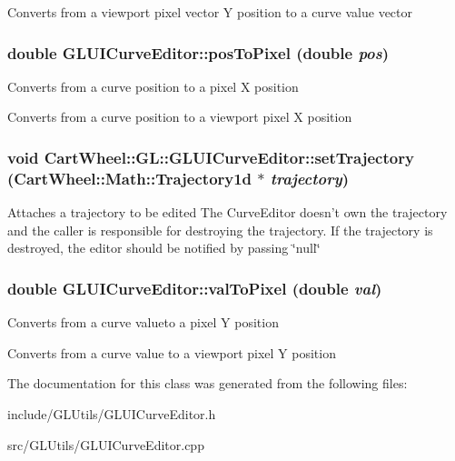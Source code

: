 Converts from a viewport pixel vector Y position to a curve value vector \hypertarget{classCartWheel_1_1GL_1_1GLUICurveEditor_a2fabff94d008f4d4575c487c43827526}{
\subsubsection[{posToPixel}]{\setlength{\rightskip}{0pt plus 5cm}double GLUICurveEditor::posToPixel (double {\em pos})}}
\label{classCartWheel_1_1GL_1_1GLUICurveEditor_a2fabff94d008f4d4575c487c43827526}
Converts from a curve position to a pixel X position

Converts from a curve position to a viewport pixel X position \hypertarget{classCartWheel_1_1GL_1_1GLUICurveEditor_a6787e7d93f5e6ab2da85f5d8b675506e}{
\subsubsection[{setTrajectory}]{\setlength{\rightskip}{0pt plus 5cm}void CartWheel::GL::GLUICurveEditor::setTrajectory ({\bf CartWheel::Math::Trajectory1d} $\ast$ {\em trajectory})}}
\label{classCartWheel_1_1GL_1_1GLUICurveEditor_a6787e7d93f5e6ab2da85f5d8b675506e}
Attaches a trajectory to be edited The CurveEditor doesn't own the trajectory and the caller is responsible for destroying the trajectory. If the trajectory is destroyed, the editor should be notified by passing \char`\"{}null\char`\"{} \hypertarget{classCartWheel_1_1GL_1_1GLUICurveEditor_a82491a5d07af8e75298bd6118739b1d8}{
\subsubsection[{valToPixel}]{\setlength{\rightskip}{0pt plus 5cm}double GLUICurveEditor::valToPixel (double {\em val})}}
\label{classCartWheel_1_1GL_1_1GLUICurveEditor_a82491a5d07af8e75298bd6118739b1d8}
Converts from a curve valueto a pixel Y position

Converts from a curve value to a viewport pixel Y position 

The documentation for this class was generated from the following files:\begin{DoxyCompactItemize}
\item 
include/GLUtils/GLUICurveEditor.h\item 
src/GLUtils/GLUICurveEditor.cpp\end{DoxyCompactItemize}
